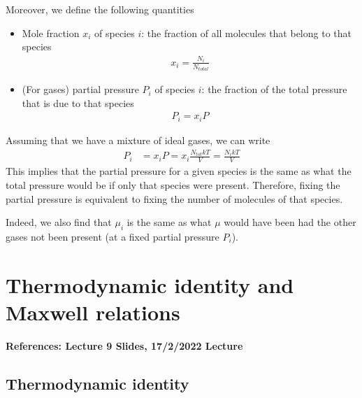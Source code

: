 \documentclass[11pt]{article}
\begin{document}
Moreover, we define the following quantities
\begin{itemize}
    \item Mole fraction $x_i$ of species $i$: the fraction of all molecules that belong to that species 
\begin{align*}
    x_i = \frac{N_i}{N_{total}}
\end{align*}
\item (For gases) partial pressure $P_i$ of species $i$: the fraction of the total pressure that is due to that species 
\begin{align*}
    P_i = x_i P 
\end{align*}
\end{itemize}
Assuming that we have a mixture of ideal gases, we can write
\begin{align*}
    P_i &= x_i P = x_i \frac{N_{tot} kT}{V} = \frac{N_i kT}{V}
\end{align*}
This implies that the partial pressure for a given species is the same as what the total pressure would be if only that species were present. Therefore, fixing the partial pressure is equivalent to fixing the number of molecules of that species. 

Indeed, we also find that $\mu_i$ is the same as what $\mu$ would have been had the other gases not been present (at a fixed partial pressure $P_i$). 


\section{Thermodynamic identity and Maxwell relations}
\textbf{References: Lecture 9 Slides, 17/2/2022 Lecture}

\subsection{Thermodynamic identity}
\end{document}
